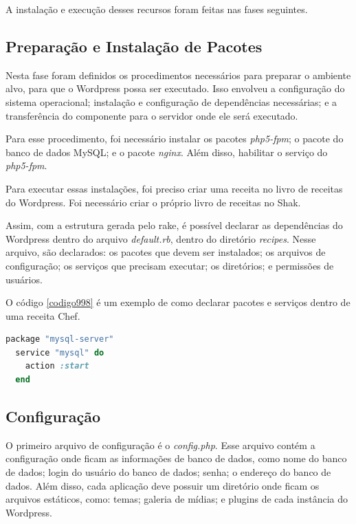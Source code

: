A instalação e execução desses recursos foram feitas nas fases seguintes.

\subsection{Preparação e Instalação de Pacotes}
\label{wordpress:preparacao}

Nesta fase foram definidos os procedimentos necessários para 
preparar o ambiente alvo, para que o Wordpress
possa ser executado. Isso envolveu a configuração do sistema operacional; instalação
e configuração de dependências necessárias; e a transferência do componente
para o servidor onde ele será executado.

Para esse procedimento, foi necessário instalar os pacotes \textit{php5-fpm}; o pacote
do banco de dados MySQL; e o pacote \textit{nginx}. Além disso, habilitar o serviço do
\textit{php5-fpm}.
 
Para executar essas instalações, foi preciso criar uma receita no livro de receitas
do Wordpress. Foi necessário criar o próprio livro de receitas no Shak.

Assim, com a estrutura gerada pelo rake, é possível declarar as dependências do Wordpress
dentro do arquivo \textit{default.rb}, dentro do diretório \textit{recipes}. Nesse 
arquivo, são declarados: os pacotes que devem ser instalados; os arquivos de configuração;
os serviços que precisam executar; os diretórios; e permissões de usuários. 

O código \ref{codigo998} é um exemplo de como declarar pacotes e serviços dentro de uma receita Chef.

\begin{lstlisting}[basicstyle=\ttfamily, language=Ruby,label=dice_index,caption={Exemplo de criação de serviço do mysql com o chef}, label=codigo998]
  package "mysql-server"
  service "mysql" do
    action :start
  end
\end{lstlisting}

\subsection{Configuração}
\label{wordpress:preparacao}

O primeiro arquivo de configuração é o \textit{config.php}. Esse arquivo contém a
configuração onde ficam as informações de banco de dados, como nome do banco de dados;
login do usuário do banco de dados; senha; o endereço do banco de dados. Além disso,
cada aplicação deve possuir um diretório
onde ficam os arquivos estáticos, como: temas; galeria de mídias; e plugins 
de cada instância do Wordpress.

